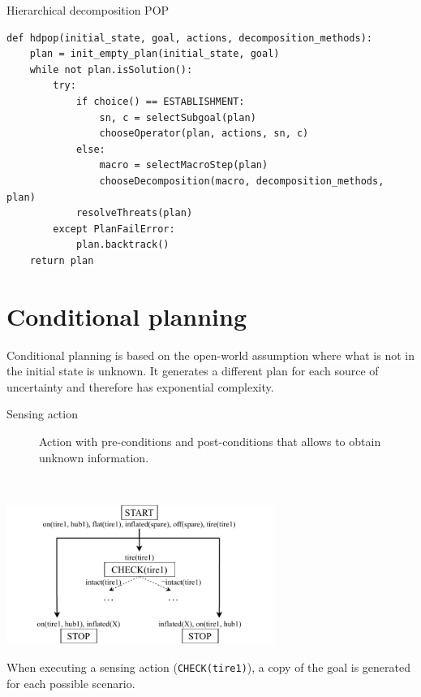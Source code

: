 \begin{algorithm}
\caption{Hierarchical decomposition POP}
\begin{lstlisting}[mathescape=true]
def hdpop(initial_state, goal, actions, decomposition_methods):
    plan = init_empty_plan(initial_state, goal)
    while not plan.isSolution():
        try:
            if choice() == ESTABLISHMENT:
                sn, c = selectSubgoal(plan)
                chooseOperator(plan, actions, sn, c)
            else:
                macro = selectMacroStep(plan)
                chooseDecomposition(macro, decomposition_methods, plan)
            resolveThreats(plan)
        except PlanFailError:
            plan.backtrack()
    return plan
\end{lstlisting}
\end{algorithm}



\section{Conditional planning}
Conditional planning is based on the open-world assumption where what is not in the initial state is unknown.
It generates a different plan for each source of uncertainty and therefore has exponential complexity.

\begin{description}
    \item[Sensing action] 
        Action with pre-conditions and post-conditions that allows to obtain unknown information.
\end{description}


\begin{example}
    \phantom{}\\
    \begin{center}
        \includegraphics[width=0.65\textwidth]{img/_conditional_planning.pdf}
    \end{center}

    When executing a sensing action (\texttt{CHECK(tire1)}), a copy of the goal is generated for each possible scenario.
\end{example}



